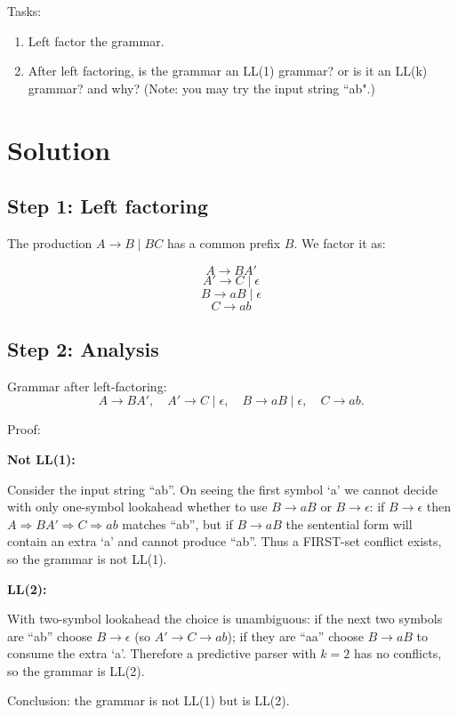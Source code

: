 Tasks:
\begin{enumerate}
    \item Left factor the grammar.
    \item After left factoring, is the grammar an LL(1) grammar? or is it an LL(k) grammar? and why? (Note: you may try the input string ``ab".)
\end{enumerate}

\section{Solution}

\subsection{Step 1: Left factoring}

The production $A \to B \;|\; BC$ has a common prefix $B$. We factor it as:

\[
A \to B A'
\]
\[
A' \to C \;|\; \epsilon
\]
\[
B \to a B \;|\; \epsilon
\]
\[
C \to a b
\]

\subsection{Step 2: Analysis}

Grammar after left-factoring:
\[
A\to B A',\quad A'\to C\mid\epsilon,\quad B\to aB\mid\epsilon,\quad C\to ab.
\]

Proof:

\textbf{Not LL(1): }

Consider the input string ``ab''. On seeing the first symbol `a' we cannot decide with only one-symbol lookahead whether to use $B\to aB$ or $B\to\epsilon$: if $B\to\epsilon$ then $A\Rightarrow B A'\Rightarrow C\Rightarrow ab$ matches ``ab'', but if $B\to aB$ the sentential form will contain an extra `a' and cannot produce ``ab''. Thus a FIRST-set conflict exists, so the grammar is not LL(1).

\textbf{LL(2): }

With two-symbol lookahead the choice is unambiguous: if the next two symbols are ``ab'' choose $B\to\epsilon$ (so $A'\to C\to ab$); if they are ``aa'' choose $B\to aB$ to consume the extra `a'. Therefore a predictive parser with $k=2$ has no conflicts, so the grammar is LL(2).

Conclusion: the grammar is not LL(1) but is LL(2).

